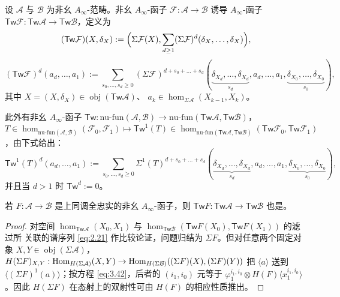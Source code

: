 \begin{Def}\label{def:3.29}
设 $\mathcal A$ 与 $\mathcal B$ 为非幺 $A_\infty$-范畴。非幺 $A_\infty$-函子
$\mathcal F:\mathcal A\to\mathcal B$ 诱导 $A_\infty$-函子
$\mathsf{Tw}\mathcal F:\mathsf{Tw}\mathcal A\to\mathsf{Tw}\mathcal B$，定义为
\begin{equation}\label{eq:3.47}
  (\mathsf{Tw}\mathcal F)(X,\delta_X):=
  \Bigl(\Sigma\mathcal F(X),\sum_{d\ge 1}(\Sigma\mathcal F)^d
  (\delta_X,\dots,\delta_X)\Bigr),
\end{equation}
\[
  (\mathsf{Tw}\mathcal F)^d(a_d,\dots,a_1):=
  \sum_{s_0,\dots,s_d\ge 0}(\Sigma\mathcal F)^{d+s_0+\dots+s_d}
  (\underbrace{\delta_{X_d},\dots,\delta_{X_d}}_{s_d},a_d,\dots,a_1,
  \underbrace{\delta_{X_0},\dots,\delta_{X_0}}_{s_0}),
\]
其中 $X=(X,\delta_X)\in\operatorname{obj}(\mathsf{Tw}\mathcal A)$、
$a_k\in\hom_{\Sigma\mathcal A}(X_{k-1},X_k)$。

此外有非幺 $A_\infty$-函子
$\mathsf{Tw}:\mathrm{nu\text{-}fun}(\mathcal A,\mathcal B)\to
\mathrm{nu\text{-}fun}(\mathsf{Tw}\mathcal A,\mathsf{Tw}\mathcal B)$，
$T\in\hom_{\mathrm{nu\text{-}fun}(\mathcal A,\mathcal B)}(\mathcal F_0,
\mathcal F_1)\mapsto\mathsf{Tw}^1(T)\in
\hom_{\mathrm{nu\text{-}fun}(\mathsf{Tw}\mathcal A,\mathsf{Tw}\mathcal B)}
(\mathsf{Tw}\mathcal F_0,\mathsf{Tw}\mathcal F_1)$，由下式给出：
\[
  \mathsf{Tw}^1(T)^d(a_d,\dots,a_1):=
  \sum_{s_0,\dots,s_d\ge 0}\Sigma^1(T)^{d+s_0+\dots+s_d}
  (\underbrace{\delta_{X_d},\dots,\delta_{X_d}}_{s_d},a_d,\dots,a_1,
  \underbrace{\delta_{X_0},\dots,\delta_{X_0}}_{s_0}),
\]
并且当 $d>1$ 时 $\mathsf{Tw}^d:=0$。
\end{Def}

\begin{Lem}\label{lem:3.30}
若 $F:\mathcal A\to\mathcal B$ 是上同调全忠实的非幺 $A_\infty$-函子，则
$\mathsf{Tw}F:\mathsf{Tw}\mathcal A\to\mathsf{Tw}\mathcal B$ 也是。
\end{Lem}

\begin{proof}
对空间 $\hom_{\mathsf{Tw}\mathcal A}(X_0,X_1)$ 与
$\hom_{\mathsf{Tw}\mathcal B}(\mathsf{Tw}F(X_0),\mathsf{Tw}F(X_1))$ 的滤过所
关联的谱序列 \eqref{eq:2.21} 作比较论证，问题归结为 $\Sigma F$。但对任意两个固定对象
$X,Y\in\operatorname{obj}(\Sigma\mathcal A)$，$H(\Sigma F)_{X,Y}:
\operatorname{Hom}_{H(\Sigma\mathcal A)}(X,Y)\to\operatorname{Hom}_{H(\Sigma\mathcal B)}
((\Sigma F)(X),(\Sigma F)(Y))$ 把 $\langle a\rangle$ 送到
$\langle(\Sigma F)^1(a)\rangle$；按方程 \eqref{eq:3.42}，后者的 $(i_1,i_0)$ 元等于
$\varphi_1^{i_1,i_0}\otimes H(F)\langle x_1^{i_1,i_0}\rangle$。因此
$H(\Sigma F)$ 在态射上的双射性可由 $H(F)$ 的相应性质推出。
\end{proof}

